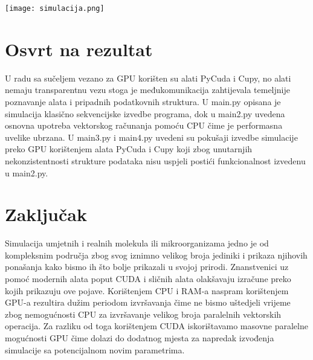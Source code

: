 \documentclass[12pt]{article}
\begin{document}
	\texttt{[image: simulacija.png]}
	
	\section{Osvrt na rezultat}
	U radu sa sučeljem vezano za GPU korišten su alati PyCuda i Cupy, no alati nemaju transparentnu vezu stoga je međukomunikacija zahtijevala temeljnije poznavanje alata i pripadnih podatkovnih struktura. U main.py opisana je simulacija klasično sekvencijske izvedbe programa, dok u main2.py uvedena osnovna upotreba vektorskog računanja pomoću CPU čime je performasna uvelike ubrzana. U main3.py i main4.py uvedeni su pokušaji izvedbe simulacije preko GPU korištenjem alata PyCuda i Cupy koji zbog unutarnjih nekonzistentnosti strukture podataka nisu uspjeli postići funkcionalnost izvedenu u main2.py. 
	
	\section{Zaključak}
	Simulacija umjetnih i realnih molekula ili mikroorganizama jedno je od kompleksnim područja zbog svog iznimno velikog 
    broja jediniki i prikaza njihovih ponašanja kako bismo ih što bolje prikazali u svojoj prirodi. Znanstvenici uz pomoć
    modernih alata poput CUDA i sličnih alata olakšavaju izračune preko kojih prikazuju ove pojave. Korištenjem CPU i RAM-a 
    naspram korištenjem GPU-a rezultira dužim periodom izvršavanja čime ne bismo uštedjeli vrijeme zbog nemogućnosti CPU za izvršavanje velikog broja paralelnih vektorskih operacija.
    Za razliku od toga korištenjem CUDA iskorištavamo masovne paralelne mogućnosti GPU čime dolazi do dodatnog mjesta za napredak izvođenja simulacije sa
    potencijalnom novim parametrima.
    
\end{document}
